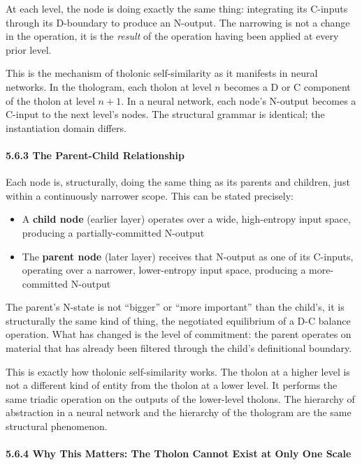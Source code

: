 \documentclass[
  11pt,
  letterpaper,
]{article}
\providecommand{\tightlist}{%
  \setlength{\itemsep}{0pt}\setlength{\parskip}{0pt}}
\begin{document}
At each level, the node is doing exactly the same thing: integrating its
C-inputs through its D-boundary to produce an N-output. The narrowing is
not a change in the operation, it is the \emph{result} of the operation
having been applied at every prior level.

This is the mechanism of tholonic self-similarity as it manifests in
neural networks. In the thologram, each tholon at level \(n\) becomes a
D or C component of the tholon at level \(n+1\). In a neural network,
each node's N-output becomes a C-input to the next level's nodes. The
structural grammar is identical; the instantiation domain differs.

\paragraph{5.6.3 The Parent-Child
Relationship}\label{the-parent-child-relationship}

Each node is, structurally, doing the same thing as its parents and
children, just within a continuously narrower scope. This can be stated
precisely:

\begin{itemize}
\tightlist
\item
  A \textbf{child node} (earlier layer) operates over a wide,
  high-entropy input space, producing a partially-committed N-output
\item
  The \textbf{parent node} (later layer) receives that N-output as one
  of its C-inputs, operating over a narrower, lower-entropy input space,
  producing a more-committed N-output
\end{itemize}

The parent's N-state is not ``bigger'' or ``more important'' than the
child's, it is structurally the same kind of thing, the negotiated
equilibrium of a D-C balance operation. What has changed is the level of
commitment: the parent operates on material that has already been
filtered through the child's definitional boundary.

This is exactly how tholonic self-similarity works. The tholon at a
higher level is not a different kind of entity from the tholon at a
lower level. It performs the same triadic operation on the outputs of
the lower-level tholons. The hierarchy of abstraction in a neural
network and the hierarchy of the thologram are the same structural
phenomenon.

\paragraph{5.6.4 Why This Matters: The Tholon Cannot Exist at Only One
Scale}\label{why-this-matters-the-tholon-cannot-exist-at-only-one-scale}
\end{document}
